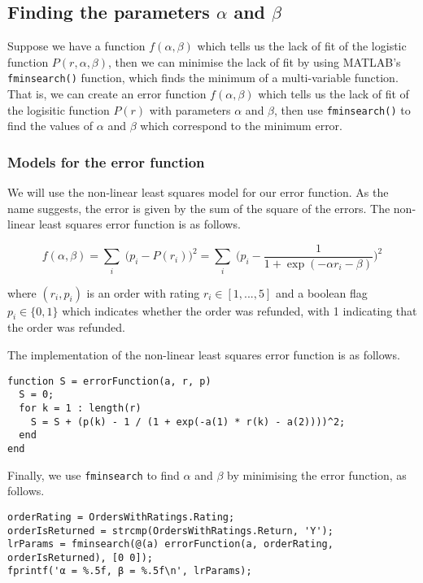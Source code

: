 \subsection{Finding the parameters $\alpha$ and $\beta$}
Suppose we have a function $f(\alpha, \beta)$ which tells us the lack of fit of the logistic function $P(r, \alpha, \beta)$, then we can minimise the lack of fit by using MATLAB's \lstinline|fminsearch()| function, which finds the minimum of a multi-variable function. That is, we can create an error function $f(\alpha, \beta)$ which tells us the lack of fit of the logisitic function $P(r)$ with parameters $\alpha$ and $\beta$, then use \lstinline|fminsearch()| to find the values of $\alpha$ and $\beta$ which correspond to the minimum error.

\subsubsection{Models for the error function}
We will use the non-linear least squares model for our error function. As the name suggests, the error is given by the sum of the square of the errors. The non-linear least squares error function is as follows.

$$f(\alpha, \beta) = \sum_i \; \Big(p_i - P(r_i)\Big)^2 = \sum_i \; \Bigg(p_i - \frac{1}{1 + \exp(-\alpha r_i - \beta)}\Bigg)^2$$

\noindent
where $(r_i, p_i)$ is an order with rating $r_i \in [1, ..., 5]$ and a boolean flag $p_i \in \{0, 1\}$ which indicates whether the order was refunded, with 1 indicating that the order was refunded.

\noindent
The implementation of the non-linear least squares error function is as follows.

\begin{lstlisting}
function S = errorFunction(a, r, p)
  S = 0;
  for k = 1 : length(r)
    S = S + (p(k) - 1 / (1 + exp(-a(1) * r(k) - a(2))))^2;
  end
end
\end{lstlisting}

\noindent
Finally, we use \lstinline|fminsearch| to find $\alpha$ and $\beta$ by minimising the error function, as follows.

\begin{lstlisting}
orderRating = OrdersWithRatings.Rating;
orderIsReturned = strcmp(OrdersWithRatings.Return, 'Y');
lrParams = fminsearch(@(a) errorFunction(a, orderRating, orderIsReturned), [0 0]);
fprintf('α = %.5f, β = %.5f\n', lrParams); 
\end{lstlisting}

